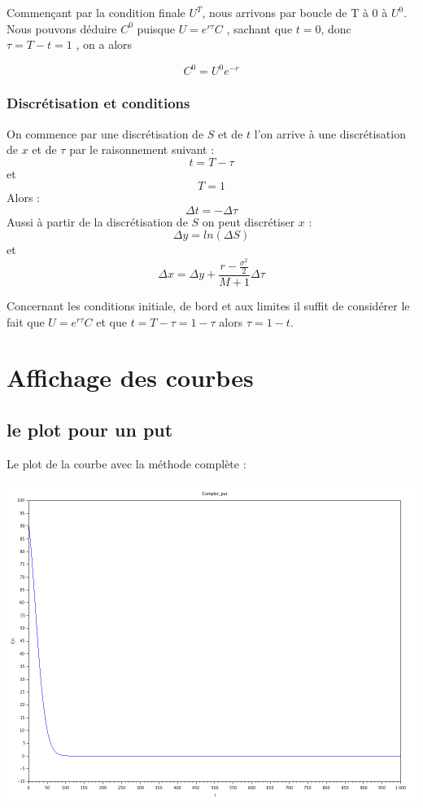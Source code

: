 \documentclass[a4paper, 12pt]{article}
\begin{document}
Commençant par la condition finale $U^T$, nous arrivons par boucle de T à 0 à $U^0$. Nous pouvons déduire $C^0$ puisque $U=e^{r\tau}C$ , sachant que $t=0$, donc $ \tau = T-t =1$ , on a alors 

$$ C^0 = U^0e^{-r}$$

\subsubsection{Discrétisation et conditions}
On commence par une discrétisation de $S$ et de $t$ l'on arrive à une discrétisation de $x$ et de $\tau$ par le raisonnement suivant :\\
$$t=T-\tau$$  et $$T=1$$
Alors : \\
$$\Delta{t}=-\Delta{\tau}$$
Aussi à partir de la discrétisation de $S$ on peut discrétiser $x$ :\\

$$\Delta{y}=ln(\Delta{S})$$
et\\

$$\Delta{x} = \Delta{y}+\frac{r-\frac{\sigma^2}{2}}{M+1}\Delta{\tau}$$

Concernant les conditions initiale, de bord et aux limites il suffit de considérer le fait que $U=e^{r\tau} C$ et que $t=T-\tau=1-\tau$ alors $\tau=1-t$.



\newpage
\section{Affichage des courbes}

\subsection{le plot pour un put}
Le plot de la courbe avec la méthode complète :


\includegraphics[scale=0.8]{Images/complet_put.png} 
\end{document}
